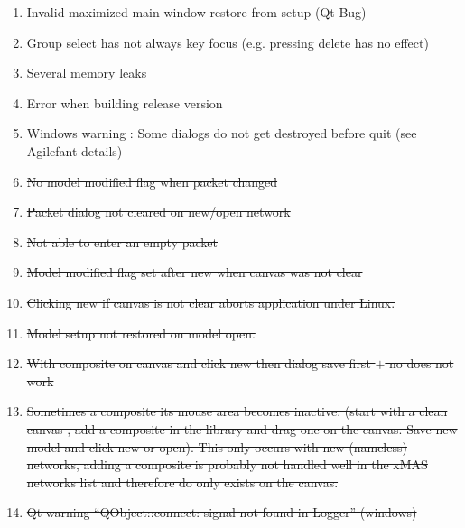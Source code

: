 \begin{enumerate} \label{sec:bug-list}
\item	Invalid maximized main window restore from setup (Qt Bug)
\item	Group select has not always key focus (e.g. pressing delete has no effect)
\item	Several memory leaks
\item Error when building release version
\item Windows warning : Some dialogs do not get destroyed before quit (see Agilefant details)
\item	\st{No model modified flag when packet changed}
\item	\st{Packet dialog not cleared on new/open network}
\item \st{Not able to enter an empty packet}
\item	\st{Model modified flag set after new when canvas was not clear}
\item	\st{Clicking new if canvas is not clear aborts application under Linux.}
\item	\st{Model setup not restored on model open.}
\item \st{With composite on canvas and click new then dialog save first $+$ no does not
work}
\item \st{Sometimes a composite its mouse area becomes inactive. (start with a clean
canvas , add a composite in the library and drag one on the canvas. Save new
model and click new or open). This only occurs with new (nameless) networks,
adding a composite is probably not handled well in the xMAS networks list and
therefore do only exists on the canvas.}
\item \st{Qt warning ``QObject::connect: signal not found in Logger'' (windows)}
\end{enumerate}
